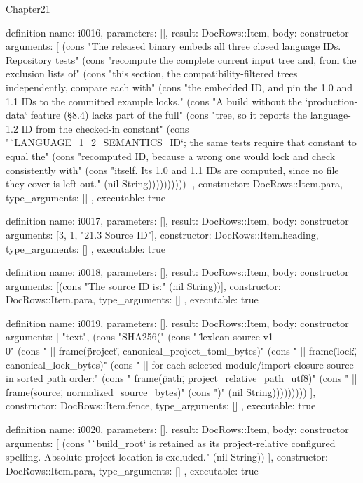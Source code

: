\begin{lexlean}{Chapter21}
\begin{semanticmodule}
definition{
  name: i0016,
  parameters: [],
  result: DocRows::Item,
  body: constructor{
    arguments: [
      (cons "The released binary embeds all three closed language IDs. Repository tests" (cons "recompute the complete current input tree and, from the exclusion lists of" (cons "this section, the compatibility-filtered trees independently, compare each with" (cons "the embedded ID, and pin the 1.0 and 1.1 IDs to the committed example locks." (cons "A build without the `production-data` feature (§8.4) lacks part of the full" (cons "tree, so it reports the language-1.2 ID from the checked-in constant" (cons "`LANGUAGE_1_2_SEMANTICS_ID`; the same tests require that constant to equal the" (cons "recomputed ID, because a wrong one would lock and check consistently with" (cons "itself. Its 1.0 and 1.1 IDs are computed, since no file they cover is left out." (nil String))))))))))
    ],
    constructor: DocRows::Item.para,
    type_arguments: []
  },
  executable: true
}

definition{
  name: i0017,
  parameters: [],
  result: DocRows::Item,
  body: constructor{
    arguments: [3, 1, "21.3 Source ID"],
    constructor: DocRows::Item.heading,
    type_arguments: []
  },
  executable: true
}

definition{
  name: i0018,
  parameters: [],
  result: DocRows::Item,
  body: constructor{
    arguments: [(cons "The source ID is:" (nil String))],
    constructor: DocRows::Item.para,
    type_arguments: []
  },
  executable: true
}

definition{
  name: i0019,
  parameters: [],
  result: DocRows::Item,
  body: constructor{
    arguments: [
      "text",
      (cons "SHA256(" (cons "  \"lexlean-source-v1\\0\"" (cons "  || frame(\"project\", canonical_project_toml_bytes)" (cons "  || frame(\"lock\", canonical_lock_bytes)" (cons "  || for each selected module/import-closure source in sorted path order:" (cons "       frame(\"path\", project_relative_path_utf8)" (cons "       || frame(\"source\", normalized_source_bytes)" (cons ")" (nil String)))))))))
    ],
    constructor: DocRows::Item.fence,
    type_arguments: []
  },
  executable: true
}

definition{
  name: i0020,
  parameters: [],
  result: DocRows::Item,
  body: constructor{
    arguments: [
      (cons "`build_root` is retained as its project-relative configured spelling. Absolute project location is excluded." (nil String))
    ],
    constructor: DocRows::Item.para,
    type_arguments: []
  },
  executable: true
}


\end{semanticmodule}
\end{lexlean}
